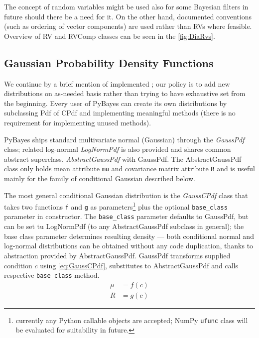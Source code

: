 The concept of random variables might be used also for some Bayesian filters in future should there
be a need for it. On the other hand, documented conventions (such as ordering of vector components)
are used rather than RVs where feasible. Overview of RV and RVComp classes can be seen in the
\autoref{fig:DiaRvs}.

\subsection{Gaussian Probability Density Functions}

We continue by a brief mention of implemented {\pdfs}; our policy is to add new distributions on
as-needed basis rather than trying to have exhaustive set from the beginning. Every user of
PyBayes can create its own distributions by subclassing Pdf of CPdf and implementing meaningful
methods (there is no requirement for implementing unused methods).

PyBayes ships standard multivariate normal (Gaussian) {\pdf} through the \emph{GaussPdf} class;
related log-normal {\pdf} \emph{LogNormPdf} is also provided and shares common abstract superclass,
\emph{AbstractGaussPdf} with GaussPdf. The AbstractGaussPdf class only holds mean attribute \verb|mu|
and covariance matrix attribute \verb|R| and is useful mainly for the family of conditional Gaussian
{\pdfs} described below.

The most general conditional Gaussian distribution is the \emph{GaussCPdf} class that takes two
functions \verb|f| and \verb|g| as parameters\footnote{currently any Python callable objects are
accepted; NumPy \verb|ufunc| class will be evaluated for suitability in future.}
plus the optional \verb|base_class| parameter in
constructor. The \verb|base_class| parameter defaults to GaussPdf, but can be set tu LogNormPdf (to
any AbstractGaussPdf subclass in general); the base class parameter determines resulting density ---
both conditional normal and log-normal distributions can be obtained without any code duplication,
thanks to abstraction provided by AbstractGaussPdf. GaussPdf transforms supplied condition \(c\)
using \eqref{eq:GaussCPdf}, substitutes to AbstractGaussPdf and calls respective \verb|base_class|
method.
\begin{equation} \label{eq:GaussCPdf}
	\begin{aligned}
		\mu &= f(c) \\
		R &= g(c)
	\end{aligned}
\end{equation}

